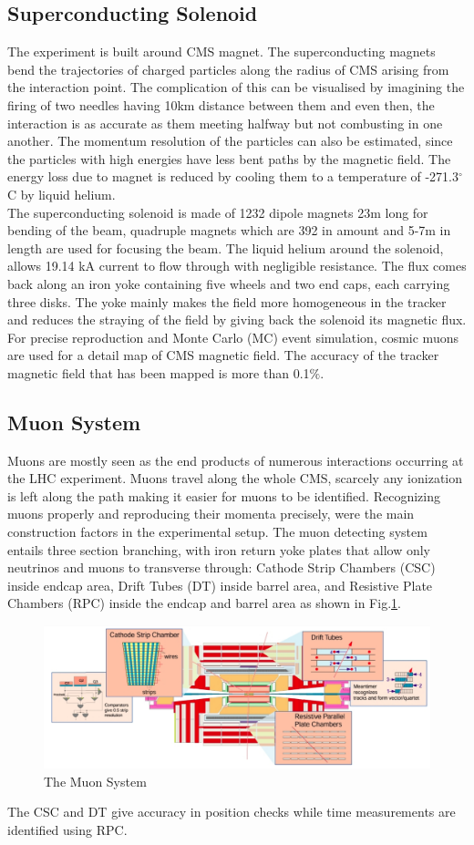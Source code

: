 \subsection{Superconducting Solenoid}
The experiment is built around CMS magnet. The superconducting magnets bend the trajectories of charged particles along the radius of CMS arising from the interaction point. The complication of this can be visualised by imagining the firing of two needles having 10km distance between them and even then, the interaction is as accurate as them meeting halfway but not combusting in one another. The momentum resolution of the particles can also be estimated, since the particles with high energies have less bent paths by the magnetic field. The energy loss due to magnet is reduced by cooling them to a temperature of -271.3$^{\circ}$C by liquid helium.\\
The superconducting solenoid is made of 1232 dipole magnets 23m long for bending of the beam, quadruple magnets which are 392 in amount and 5-7m in length are used for focusing the beam. The liquid helium around the solenoid, allows 19.14 kA current to flow through with negligible resistance. The flux comes back along an iron yoke containing five wheels and two end caps, each carrying three disks. The yoke mainly makes the field more homogeneous in the tracker and reduces the straying of the field by giving back the solenoid its magnetic flux. For precise reproduction and Monte Carlo (MC) event simulation, cosmic muons are used for a detail map of CMS magnetic field. The accuracy of the tracker magnetic field that has been mapped is more than 0.1$\%$.
\subsection{Muon System}
Muons are mostly seen as the end products of numerous interactions occurring at the LHC experiment. Muons travel along the whole CMS, scarcely any ionization is left along the path making it easier for muons to be identified. Recognizing muons properly and reproducing their momenta precisely, were the main construction factors in the experimental setup. The muon detecting system entails three section branching, with iron return yoke plates that allow only neutrinos and muons to transverse through: Cathode Strip Chambers (CSC) inside endcap area, Drift Tubes (DT) inside barrel area, and Resistive Plate Chambers (RPC) inside the endcap and barrel area as shown in Fig.\ref{fig:tms}.
\begin{figure}[h]
\centering
\includegraphics[scale=0.2]{images/ms}
\caption{The Muon System}
\label{fig:tms}
\end{figure}
The CSC and DT give accuracy in position checks while time measurements are identified using RPC.\\
